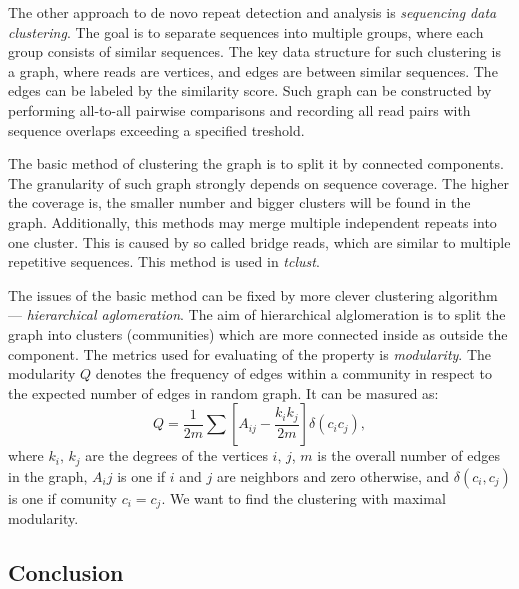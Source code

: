 The other approach to de novo repeat detection and analysis is \emph{sequencing data clustering}. The goal is to separate sequences into multiple groups, where each group consists of similar sequences.
The key data structure for such clustering is a graph, where reads are vertices, and edges are between similar sequences. The edges can be labeled by the similarity score. Such graph can be constructed by performing all-to-all pairwise comparisons and recording all read pairs with sequence overlaps exceeding a specified treshold\cite{pertea2003tigr, novak2010graph}. 

The basic method of clustering the graph is to split it by connected components. The granularity of such graph strongly depends on sequence coverage. The higher the coverage is, the smaller number and bigger clusters will be found in the graph. Additionally, this methods may merge multiple independent repeats into one cluster. This is caused by so called bridge reads, which are similar to multiple repetitive sequences. This method is used in \emph{tclust}\cite{pertea2003tigr}.

The issues of the basic method can be fixed by more clever clustering algorithm --- \emph{hierarchical aglomeration}. The aim of hierarchical alglomeration is to split the graph into clusters (communities) which are more connected inside as outside the component. The metrics used for evaluating of the property is \emph{modularity}.
The modularity $Q$ denotes the frequency of edges within a community in respect to the expected number of edges in random graph. It can be masured as:
$$Q = \frac{1}{2m}\sum\left[A_{ij}-\frac{k_i k_j}{2m}\right] \delta(c_i c_j),$$
where $k_i,\, k_j$ are the degrees of the vertices $i,\,j$, $m$ is the overall number of edges in the graph, $A_ij$ is one if $i$ and $j$ are neighbors and zero otherwise, and $\delta(c_i, c_j)$ is one if comunity $c_i = c_j$.
We want to find the clustering with maximal modularity.



\subsection{Conclusion}




